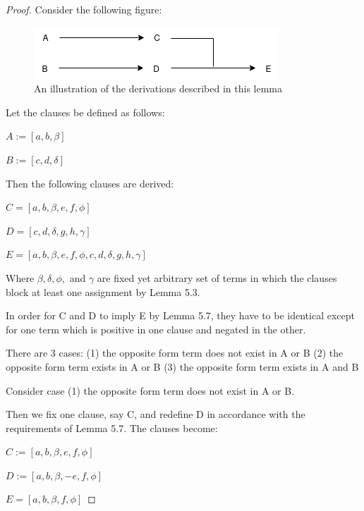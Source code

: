 \documentclass[manuscript]{acmart}
\begin{document}
    \begin{proof}
        Consider the following figure:

        \begin{figure}[h]
            \includegraphics[scale=0.8]{519a}
            \caption{An illustration of the derivations described in this lemma}
        \end{figure}

        Let the clauses be defined as follows:

        $A := [a, b, \beta]$

        $B := [c, d, \delta]$

        Then the following clauses are derived:

        $C = [a, b, \beta, e, f, \phi]$

        $D = [c, d, \delta, g, h, \gamma]$

        $E = [a, b, \beta, e, f, \phi, c, d, \delta, g, h, \gamma]$

        Where $\beta, \delta, \phi,$ and $\gamma$ are fixed yet arbitrary
        set of terms in which the clauses block at least one assignment
        by Lemma 5.3.

        In order for C and D to imply E by Lemma 5.7, they have to be
        identical except for one term which is positive in one clause
        and negated in the other.

        There are 3 cases:
        (1) the opposite form term does not exist in A or B
        (2) the opposite form term exists in A or B
        (3) the opposite form term exists in A and B
        
        Consider case (1) the opposite form term does not exist in A or B.

        Then we fix one clause, say C, and redefine D in accordance with
        the requirements of Lemma 5.7. The clauses become:

        $C := [a, b, \beta, e, f, \phi]$

        $D := [a, b, \beta, -e, f, \phi]$

        $E = [a, b, \beta, f, \phi]$


\end{proof}
\end{document}
